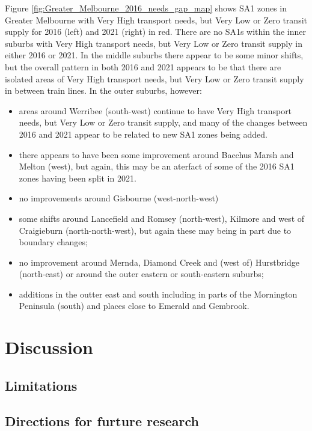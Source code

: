 \documentclass[preprint, 3p,
authoryear]{elsarticle} %
\providecommand{\tightlist}{%
  \setlength{\itemsep}{0pt}\setlength{\parskip}{0pt}}
\begin{document}
Figure \ref{fig:Greater_Melbourne_2016_needs_gap_map} shows SA1 zones in
Greater Melbourne with Very High transport needs, but Very Low or Zero
transit supply for 2016 (left) and 2021 (right) in red. There are no
SA1s within the inner suburbs with Very High transport needs, but Very
Low or Zero transit supply in either 2016 or 2021. In the middle suburbs
there appear to be some minor shifts, but the overall pattern in both
2016 and 2021 appears to be that there are isolated areas of Very High
transport needs, but Very Low or Zero transit supply in between train
lines. In the outer suburbs, however:

\begin{itemize}
\tightlist
\item
  areas around Werribee (south-west) continue to have Very High
  transport needs, but Very Low or Zero transit supply, and many of the
  changes between 2016 and 2021 appear to be related to new SA1 zones
  being added.
\item
  there appears to have been some improvement around Bacchus Marsh and
  Melton (west), but again, this may be an aterfact of some of the 2016
  SA1 zones having been split in 2021.\\
\item
  no improvements around Gisbourne (west-north-west)
\item
  some shifts around Lancefield and Romsey (north-west), Kilmore and
  west of Craigieburn (north-north-west), but again these may being in
  part due to boundary changes;
\item
  no improvement around Mernda, Diamond Creek and (west of) Hurstbridge
  (north-east) or around the outer eastern or south-eastern suburbs;
\item
  additions in the outter east and south including in parts of the
  Mornington Peninsula (south) and places close to Emerald and Gembrook.
\end{itemize}

\section{Discussion}\label{discussion}

\subsection{Limitations}\label{limitations}

\subsection{Directions for furture
research}\label{directions-for-furture-research}
\end{document}
